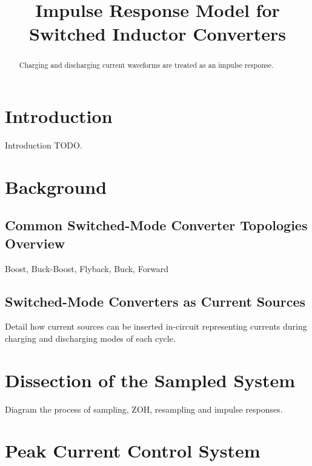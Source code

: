 \documentclass[conference]{IEEEtran}
\begin{document}
\title{Impulse Response Model for Switched Inductor Converters\\}

\author{
\and
{}
}


\maketitle

\begin{abstract}
Charging and discharging current waveforms are treated as an impulse response.
\end{abstract}


\section{Introduction}
Introduction TODO. 

\section{Background}

\subsection{Common Switched-Mode Converter Topologies Overview}

Boost, Buck-Boost, Flyback, Buck, Forward

\subsection{Switched-Mode Converters as Current Sources}

Detail how current sources can be inserted in-circuit representing currents during charging and discharging modes of each cycle.


\section{Dissection of the Sampled System}
Diagram the process of sampling, ZOH, resampling and impulse responses.



\section{Peak Current Control System}
\end{document}
